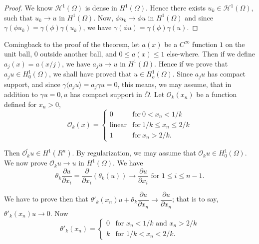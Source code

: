 \begin{proof}
We know $\mathscr{H}^1 (\Omega)$ is dense in $H^1 (\Omega)$. Hence
there exists $u_k \in \mathscr{H}^1(\Omega)$, such that $u_k
\to u$ in $H^1 (\Omega)$. Now, $\phi u_k \to \phi u$ in $H^1 (\Omega)$
and since $\gamma(\phi u_k) = \gamma(\phi) \gamma(u_k)$, we have
$\gamma(\phi u) = \gamma(\phi) \gamma(u)$. 
\end{proof}

Coming\pageoriginale back to the proof of the theorem, let $a(x)$ be a $C^\infty$
function $1$ on the unit ball, $0$ outside another ball, and $0 \leq a
(x) \leq 1 $ else-where. Then if we define $a_j (x) = a (x / j )$, we
have $a_j u \to u $ in $ H^1 (\Omega)$. Hence if we prove that $ a_j u
\in H^1_0 (\Omega)$, we shall have proved that $u \in
H^1_o (\Omega)$. Since $a_j u $ has compact support, and since $\gamma
\langle a_j u \rangle = a_j \gamma u = 0$, this means, we may assume,
that in addition to $\gamma u = 0, u$ has compact support in $\bar
{\Omega}$. Let $\mathscr{O}_k (x_n)$ be a function defined for $x_n >
0$,  
$$
\mathscr{O}_k (x) = 
\begin{cases}
  0 &\text{for}~ 0 < x_n < 1/k \\
  \text {linear} & \text{for}~ 1/k \leq x_n \leq 2/k \\
  1 &\text{for}~ x_n > 2/k. 
\end{cases}
$$

Then $\widetilde{\mathcal{O}_k u} \in H^1 (R^n)$. By
regularization, we may assume that $\mathscr{O}_k u \in H^1_0
(\Omega)$. We now prove $\mathscr{O}_k u \to u $ in $H^1 (\Omega)$. We
have  
$$
\theta_k \frac{ \partial u }{\partial x_i} = \frac { \partial}
      {\partial x_i } (\theta_k (u)) \to \frac{\partial u }{\partial
        x_i} \text { for } 1 \leq i \leq n-1. 
$$

We have to prove then that $\theta'_k (x_n) u + \theta_k
\dfrac{\partial u } {\partial x_n} \to \dfrac{\partial u } {\partial
  x_n}$; that is to say, $\theta'_k (x_n) u \to 0$. Now  
$$
\theta'_k (x_n) =
\begin{cases}
0 &\text{for } x_n < 1/k \text { and }  x_n > 2/k \\
k &\text{for } 1/k < x_n < 2/k.
\end{cases}
$$

